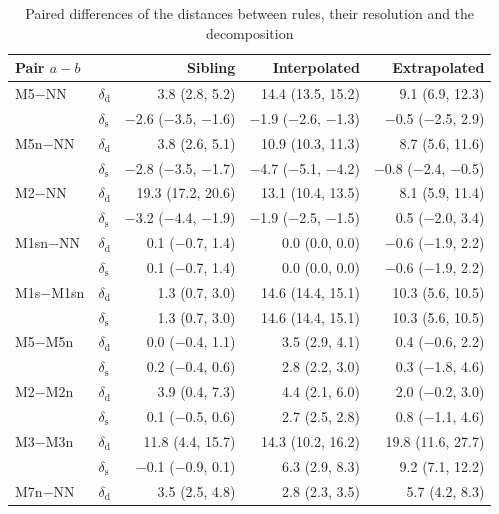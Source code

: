 \documentclass[pdflatex,sn-basic]{sn-jnl}
\newcommand{\tabsizesmall}{\footnotesize}
\begin{document}
\begin{table}[p]
\tabsizesmall
\setlength{\tabcolsep}{3pt}
\caption{Paired differences of the distances between rules, their resolution and the decomposition}\label{tab:s-paired}
\begin{tabular}{@{}llrrr@{}}
\toprule
Pair $a-b$ & & Sibling & Interpolated & Extrapolated \\
\midrule
M5$-$NN & $\delta_\mathrm{d}$ & 3.8 (2.8, 5.2) & 14.4 (13.5, 15.2) & 9.1 (6.9, 12.3) \\
 & $\delta_\mathrm{s}$ & $-$2.6 ($-$3.5, $-$1.6) & $-$1.9 ($-$2.6, $-$1.3) & $-$0.5 ($-$2.5, 2.9) \\
M5n$-$NN & $\delta_\mathrm{d}$ & 3.8 (2.6, 5.1) & 10.9 (10.3, 11.3) & 8.7 (5.6, 11.6) \\
 & $\delta_\mathrm{s}$ & $-$2.8 ($-$3.5, $-$1.7) & $-$4.7 ($-$5.1, $-$4.2) & $-$0.8 ($-$2.4, $-$0.5) \\
M2$-$NN & $\delta_\mathrm{d}$ & 19.3 (17.2, 20.6) & 13.1 (10.4, 13.5) & 8.1 (5.9, 11.4) \\
 & $\delta_\mathrm{s}$ & $-$3.2 ($-$4.4, $-$1.9) & $-$1.9 ($-$2.5, $-$1.5) & 0.5 ($-$2.0, 3.4) \\
M1sn$-$NN & $\delta_\mathrm{d}$ & 0.1 ($-$0.7, 1.4) & 0.0 (0.0, 0.0) & $-$0.6 ($-$1.9, 2.2) \\
 & $\delta_\mathrm{s}$ & 0.1 ($-$0.7, 1.4) & 0.0 (0.0, 0.0) & $-$0.6 ($-$1.9, 2.2) \\
M1s$-$M1sn & $\delta_\mathrm{d}$ & 1.3 (0.7, 3.0) & 14.6 (14.4, 15.1) & 10.3 (5.6, 10.5) \\
 & $\delta_\mathrm{s}$ & 1.3 (0.7, 3.0) & 14.6 (14.4, 15.1) & 10.3 (5.6, 10.5) \\
M5$-$M5n & $\delta_\mathrm{d}$ & 0.0 ($-$0.4, 1.1) & 3.5 (2.9, 4.1) & 0.4 ($-$0.6, 2.2) \\
 & $\delta_\mathrm{s}$ & 0.2 ($-$0.4, 0.6) & 2.8 (2.2, 3.0) & 0.3 ($-$1.8, 4.6) \\
M2$-$M2n & $\delta_\mathrm{d}$ & 3.9 (0.4, 7.3) & 4.4 (2.1, 6.0) & 2.0 ($-$0.2, 3.0) \\
 & $\delta_\mathrm{s}$ & 0.1 ($-$0.5, 0.6) & 2.7 (2.5, 2.8) & 0.8 ($-$1.1, 4.6) \\
M3$-$M3n & $\delta_\mathrm{d}$ & 11.8 (4.4, 15.7) & 14.3 (10.2, 16.2) & 19.8 (11.6, 27.7) \\
 & $\delta_\mathrm{s}$ & $-$0.1 ($-$0.9, 0.1) & 6.3 (2.9, 8.3) & 9.2 (7.1, 12.2) \\
M7n$-$NN & $\delta_\mathrm{d}$ & 3.5 (2.5, 4.8) & 2.8 (2.3, 3.5) & 5.7 (4.2, 8.3) \\

\end{tabular}
\end{table}
\end{document}
